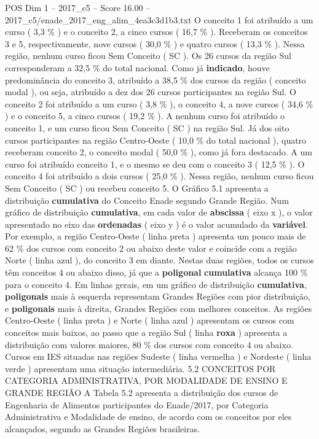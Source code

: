 \begin{textsample}{POS Dim 1 – 2017\_c5 – Score 16.00 – 2017\_c5/enade\_2017\_eng\_alim\_4ea3c3d1b3.txt}
O conceito 1 foi atribuído a um curso ( 3,3 \% ) e o conceito 2, a cinco cursos ( 16,7 \% ).
Receberam os conceitos 3 e 5, respectivamente, nove cursos ( 30,0 \% ) e quatro cursos ( 13,3 \% ).
Nessa região, nenhum curso ficou Sem Conceito ( SC ).
Os 26 cursos da região Sul corresponderam a 32,5 \% do total nacional.
Como já \textbf{indicado}, houve predominância do conceito 3, atribuído a 38,5 \% dos cursos da região ( conceito modal ), ou seja, atribuído a dez dos 26 cursos participantes na região Sul.
O conceito 2 foi atribuído a um curso ( 3,8 \% ), o conceito 4, a nove cursos ( 34,6 \% ) e o conceito 5, a cinco cursos ( 19,2 \% ).
A nenhum curso foi atribuído o conceito 1, e um curso ficou Sem Conceito ( SC ) na região Sul.
Já dos oito cursos participantes na região Centro-Oeste ( 10,0 \% do total nacional ), quatro receberam conceito 2, o conceito modal ( 50,0 \% ), como já fora destacado.
A um curso foi atribuído conceito 1, e o mesmo se deu com o conceito 3 ( 12,5 \% ).
O conceito 4 foi atribuído a dois cursos ( 25,0 \% ).
Nessa região, nenhum curso ficou Sem Conceito ( SC ) ou recebeu conceito 5.
O Gráfico 5.1 apresenta a distribuição \textbf{cumulativa} do Conceito Enade segundo Grande Região.
Num gráfico de distribuição \textbf{cumulativa}, em cada valor de \textbf{abscissa} ( eixo x ), o valor apresentado no eixo das \textbf{ordenadas} ( eixo y ) é o valor acumulado da \textbf{variável}.
Por exemplo, a região Centro-Oeste ( linha preta ) apresenta um pouco mais de 62 \% dos cursos com conceito 2 ou abaixo deste valor e coincide com a região Norte ( linha azul ), do conceito 3 em diante.
Nestas duas regiões, todos os cursos têm conceitos 4 ou abaixo disso, já que a \textbf{poligonal} \textbf{cumulativa} alcança 100 \% para o conceito 4.
Em linhas gerais, em um gráfico de distribuição \textbf{cumulativa}, \textbf{poligonais} mais à esquerda representam Grandes Regiões com pior distribuição, e \textbf{poligonais} mais à direita, Grandes Regiões com melhores conceitos.
As regiões Centro-Oeste ( linha preta ) e Norte ( linha azul ) apresentam os cursos com conceitos mais baixos, ao passo que a região Sul ( linha \textbf{roxa} ) apresenta a distribuição com valores maiores, 80 \% dos cursos com conceito 4 ou abaixo.
Cursos em IES situadas nas regiões Sudeste ( linha vermelha ) e Nordeste ( linha verde ) apresentam uma situação intermediária. 5.2 CONCEITOS POR CATEGORIA ADMINISTRATIVA, POR MODALIDADE DE ENSINO E GRANDE REGIÃO A Tabela 5.2 apresenta a distribuição dos cursos de Engenharia de Alimentos participantes do Enade/2017, por Categoria Administrativa e Modalidade de ensino, de acordo com os conceitos por eles alcançados, segundo as Grandes Regiões brasileiras.

\end{textsample}
